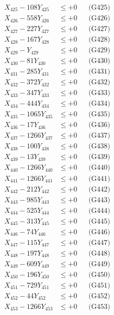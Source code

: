 \documentclass[a4paper,10pt]{article}
\begin{document}
{\begin{align}
X_{425} - 108Y_{425} &\leq +0 && \text{(G425)} \\
X_{426} - 558Y_{426} &\leq +0 && \text{(G426)} \\
X_{427} - 227Y_{427} &\leq +0 && \text{(G427)} \\
X_{428} - 167Y_{428} &\leq +0 && \text{(G428)} \\
X_{429} - Y_{429} &\leq +0 && \text{(G429)} \\
X_{430} - 81Y_{430} &\leq +0 && \text{(G430)} \\
\allowbreak
X_{431} - 285Y_{431} &\leq +0 && \text{(G431)} \\
X_{432} - 372Y_{432} &\leq +0 && \text{(G432)} \\
X_{433} - 347Y_{433} &\leq +0 && \text{(G433)} \\
X_{434} - 444Y_{434} &\leq +0 && \text{(G434)} \\
X_{435} - 1065Y_{435} &\leq +0 && \text{(G435)} \\
X_{436} - 17Y_{436} &\leq +0 && \text{(G436)} \\
X_{437} - 1266Y_{437} &\leq +0 && \text{(G437)} \\
X_{438} - 100Y_{438} &\leq +0 && \text{(G438)} \\
X_{439} - 13Y_{439} &\leq +0 && \text{(G439)} \\
X_{440} - 1266Y_{440} &\leq +0 && \text{(G440)} \\
\allowbreak
X_{441} - 1266Y_{441} &\leq +0 && \text{(G441)} \\
X_{442} - 212Y_{442} &\leq +0 && \text{(G442)} \\
X_{443} - 985Y_{443} &\leq +0 && \text{(G443)} \\
X_{444} - 525Y_{444} &\leq +0 && \text{(G444)} \\
X_{445} - 313Y_{445} &\leq +0 && \text{(G445)} \\
X_{446} - 74Y_{446} &\leq +0 && \text{(G446)} \\
X_{447} - 115Y_{447} &\leq +0 && \text{(G447)} \\
X_{448} - 197Y_{448} &\leq +0 && \text{(G448)} \\
X_{449} - 609Y_{449} &\leq +0 && \text{(G449)} \\
X_{450} - 196Y_{450} &\leq +0 && \text{(G450)} \\
\allowbreak
X_{451} - 729Y_{451} &\leq +0 && \text{(G451)} \\
X_{452} - 44Y_{452} &\leq +0 && \text{(G452)} \\
X_{453} - 1266Y_{453} &\leq +0 && \text{(G453)} \\

\end{align}}
\end{document}

